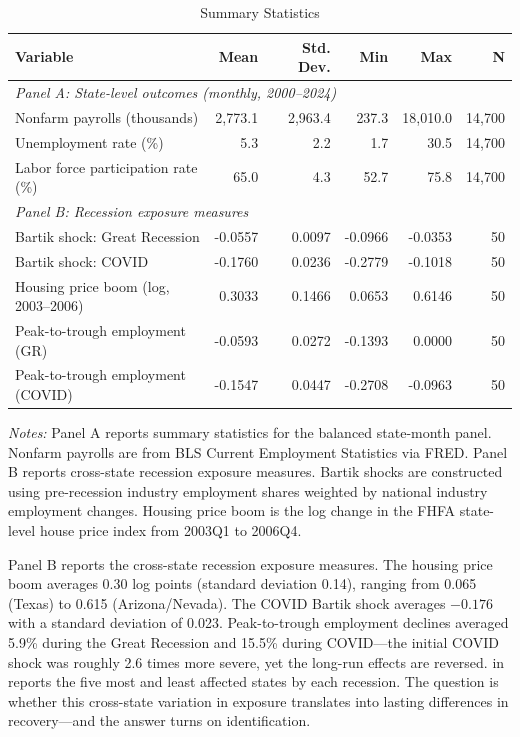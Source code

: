 \documentclass[12pt]{article}
\begin{document}
\begin{table}[H]
\centering
\caption{Summary Statistics}
\begin{threeparttable}
\begin{tabular}{lrrrrr}
\toprule
Variable & Mean & Std. Dev. & Min & Max & N \\
\midrule
\multicolumn{6}{l}{\textit{Panel A: State-level outcomes (monthly, 2000--2024)}} \\[3pt]
Nonfarm payrolls (thousands) & 2,773.1 & 2,963.4 & 237.3 & 18,010.0 & 14,700 \\
Unemployment rate (\%) & 5.3 & 2.2 & 1.7 & 30.5 & 14,700 \\
Labor force participation rate (\%) & 65.0 & 4.3 & 52.7 & 75.8 & 14,700 \\
\midrule
\multicolumn{6}{l}{\textit{Panel B: Recession exposure measures}} \\[3pt]
Bartik shock: Great Recession & -0.0557 & 0.0097 & -0.0966 & -0.0353 & 50 \\
Bartik shock: COVID & -0.1760 & 0.0236 & -0.2779 & -0.1018 & 50 \\
Housing price boom (log, 2003--2006) & 0.3033 & 0.1466 & 0.0653 & 0.6146 & 50 \\
Peak-to-trough employment (GR) & -0.0593 & 0.0272 & -0.1393 & 0.0000 & 50 \\
Peak-to-trough employment (COVID) & -0.1547 & 0.0447 & -0.2708 & -0.0963 & 50 \\
\bottomrule
\end{tabular}
\begin{tablenotes}[flushleft]
\small
\item \textit{Notes:} Panel A reports summary statistics for the balanced state-month panel. Nonfarm payrolls are from BLS Current Employment Statistics via FRED. Panel B reports cross-state recession exposure measures. Bartik shocks are constructed using pre-recession industry employment shares weighted by national industry employment changes. Housing price boom is the log change in the FHFA state-level house price index from 2003Q1 to 2006Q4.
\end{tablenotes}
\end{threeparttable}
\label{tab:summary}
\end{table}

Panel B reports the cross-state recession exposure measures. The housing price boom averages 0.30 log points (standard deviation 0.14), ranging from 0.065 (Texas) to 0.615 (Arizona/Nevada). The COVID Bartik shock averages $-0.176$ with a standard deviation of 0.023. Peak-to-trough employment declines averaged 5.9\% during the Great Recession and 15.5\% during COVID---the initial COVID shock was roughly 2.6 times more severe, yet the long-run effects are reversed.  in  reports the five most and least affected states by each recession. The question is whether this cross-state variation in exposure translates into lasting differences in recovery---and the answer turns on identification.
\end{document}
